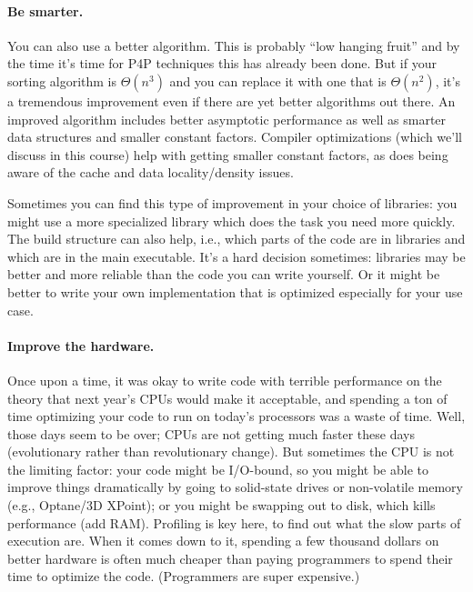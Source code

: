 \paragraph{Be smarter.} You can also use a better algorithm. This is probably ``low hanging fruit'' and by the time it's time for P4P techniques this has already been done. But if your sorting algorithm is $\Theta(n^{3})$ and you can replace it with one that is $\Theta(n^{2})$, it's a tremendous improvement even if there are yet better algorithms out there. An improved algorithm includes better asymptotic performance
as well as smarter data structures and smaller constant factors.
Compiler optimizations (which we'll discuss in this course) help with
getting smaller constant factors, as does being aware of the cache
and data locality/density issues.

Sometimes you can find this type of improvement in your choice of
libraries: you might use a more specialized library which does the
task you need more quickly. The build structure can also help, i.e., which parts of the code are in libraries and which are in the main executable. It's a hard decision sometimes: libraries may be better and more reliable than the code you can write yourself. Or it might be better to write your own implementation that is optimized especially for your use case.

\paragraph{Improve the hardware.} Once upon a time, it was okay to write code with terrible performance on the theory that next year's CPUs would make it acceptable, and spending a ton of time optimizing your code to run on today's processors was a waste of time. Well, those days seem to be over; CPUs are not getting much faster these days (evolutionary rather than revolutionary change). But sometimes the CPU is not the limiting factor: your code might be I/O-bound, so you might be able
to improve things dramatically by going to solid-state drives or non-volatile memory (e.g., Optane/3D XPoint); or you might be swapping
out to disk, which kills performance (add RAM). Profiling is key here, to find out what the slow parts of execution are. When it comes down to it, spending a few thousand dollars on better hardware is often much cheaper than paying programmers to spend their time to optimize the code. (Programmers are super expensive.)

